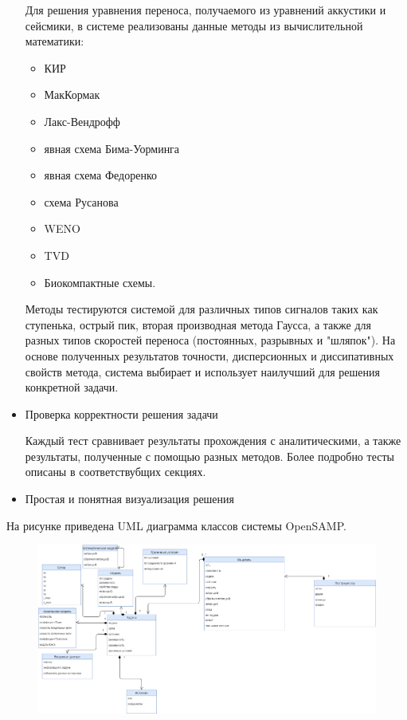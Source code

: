 \documentclass{article}
\begin{document}
\begin{itemize}
Для решения уравнения переноса, получаемого из уравнений аккустики и сейсмики, в системе реализованы данные методы из вычислительной математики:
\begin{itemize}
 \item КИР \item МакКормак \item Лакс-Вендрофф \item явная схема Бима-Уорминга \item явная схема Федоренко \item схема Русанова \item WENO \item TVD \item Биокомпактные схемы. 
\end{itemize}
Методы тестируются системой для различных типов сигналов таких как ступенька, острый пик, вторая производная метода Гаусса, а также для разных типов скоростей переноса (постоянных, разрывных и "шляпок"). На основе полученных результатов точности, дисперсионных и диссипативных свойств метода, система выбирает и использует наилучший для решения конкретной задачи. 

\item Проверка корректности решения задачи 

Каждый тест сравнивает результаты прохождения с аналитическими, а также результаты, полученные с помощью разных методов.
Более подробно тесты описаны в соответствубщих секциях.
\item Простая и понятная визуализация решения
\end{itemize}

На рисунке приведена UML диаграмма классов системы OpenSAMP. 
\begin{figure}[h]
  \begin{center}
    \includegraphics[scale=0.3]{architec.png}
  \end{center}
\end{figure}
\end{document}
